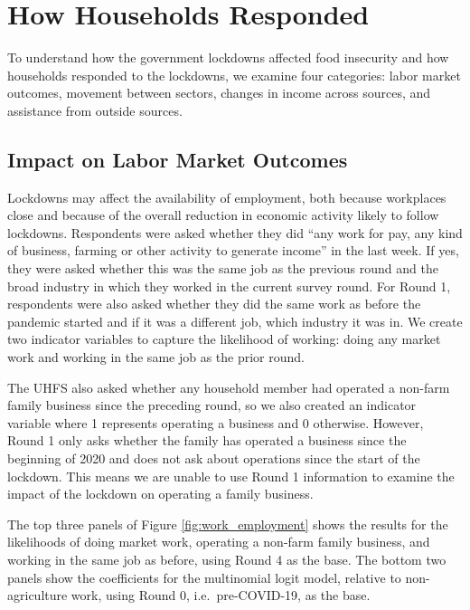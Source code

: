 \documentclass{wber}
\begin{document}
\section{How Households Responded}\label{how-households-responded}

To understand how the government lockdowns affected food insecurity and
how households responded to the lockdowns, we examine four categories:
labor market outcomes, movement between sectors, changes in income
across sources, and assistance from outside sources.

\subsection{Impact on Labor Market Outcomes}\label{impact-on-labor-market-outcomes}

Lockdowns may affect the availability of employment, both because
workplaces close and because of the overall reduction in economic
activity likely to follow lockdowns. Respondents were asked whether they
did ``any work for pay, any kind of business, farming or other activity
to generate income'' in the last week. If yes, they were asked whether
this was the same job as the previous round and the broad industry in
which they worked in the current survey round. For Round 1, respondents
were also asked whether they did the same work as before the pandemic
started and if it was a different job, which industry it was in. We
create two indicator variables to capture the likelihood of working:
doing any market work and working in the same job as the prior round.

The UHFS also asked whether any household member had operated a non-farm
family business since the preceding round, so we also created an
indicator variable where 1 represents operating a business and 0
otherwise. However, Round 1 only asks whether the family has operated a
business since the beginning of 2020 and does not ask about operations
since the start of the lockdown. This means we are unable to use Round 1
information to examine the impact of the lockdown on operating a family
business.

The top three panels of Figure \ref{fig:work_employment} shows the results
for the likelihoods of doing market work, operating a non-farm family
business, and working in the same job as before, using Round 4 as the
base. The bottom two panels show the coefficients for the multinomial
logit model, relative to non-agriculture work, using Round 0,
i.e.\ pre-COVID-19, as the base.
\end{document}
